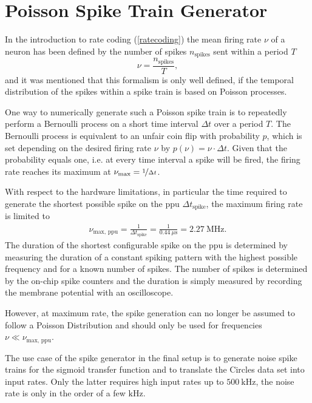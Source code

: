 \section{Poisson Spike Train Generator}
\label{poissonspiketrains}
In the introduction to rate coding (\cref{ratecoding}) the mean firing rate $\nu$ of a neuron has been defined by the number of spikes $n_\text{spikes}$ sent within a period $T$
\begin{equation*}
\nu = \frac{n_\text{spikes}}{T},
\end{equation*}
and it was mentioned that this formalism is only well defined, if the temporal distribution of the spikes within a spike train is based on Poisson processes.

One way to numerically generate such a Poisson spike train is to repeatedly perform a Bernoulli process on a short time interval $\Delta t$ over a period $T$. The Bernoulli process is equivalent to an unfair coin flip with probability $p$, which is set depending on the desired firing rate $\nu$ by $p(\nu) = \nu \cdot \Delta t$. Given that the probability equals one, i.e. at every time interval a spike will be fired, the firing rate reaches its maximum at $\nu_\text{max} = \nicefrac{1}{\Delta t}$.

With respect to the hardware limitations, in particular the time required to generate the shortest possible spike on the \gls{ppu} $\Delta t_\text{spike}$, the maximum firing rate is limited to 
\begin{align*}
\nu_\text{max, ppu} = \frac{1}{\Delta t_\text{spike}} = \frac{1}{\SI{0.44}{\mu \s}} = \SI{2.27}{\mega \Hz}.
\end{align*}
The duration of the shortest configurable spike on the \gls{ppu} is determined by measuring the duration of a constant spiking pattern with the highest possible frequency and for a known number of spikes. The number of spikes is determined by the on-chip spike counters and the duration is simply measured by recording the membrane potential with an oscilloscope.

However, at maximum rate, the spike generation can no longer be assumed to follow a Poisson Distribution and should only be used for frequencies $\nu \ll \nu_\text{max, ppu}$.

The use case of the spike generator in the final setup is to generate noise spike trains for the sigmoid transfer function and to translate the Circles data set into input rates. Only the latter requires high input rates up to $\SI{500}{\kilo \Hz}$, the noise rate is only in the order of a few $\si{\kilo \Hz}$.

